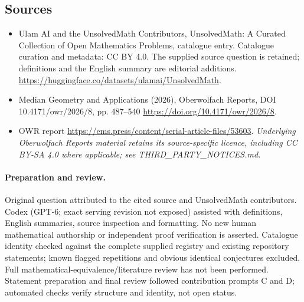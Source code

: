 \documentclass[11pt]{article}
\begin{document}
\subsection{Sources}
\begin{itemize}
\item[\hypertarget{source:statement:1}{S1}] Ulam AI and the UnsolvedMath Contributors, UnsolvedMath: A Curated Collection of Open Mathematics Problems, catalogue entry. Catalogue curation and metadata: CC BY 4.0. The supplied source question is retained; definitions and the English summary are editorial additions.
\url{https://huggingface.co/datasets/ulamai/UnsolvedMath}.
\item[\hypertarget{source:statement:2}{S2}] Median Geometry and Applications (2026), Oberwolfach Reports, DOI 10.4171/owr/2026/8, pp. 487--540
\url{https://doi.org/10.4171/owr/2026/8}.
\item[\hypertarget{source:statement:3}{S3}] OWR report
\url{https://ems.press/content/serial-article-files/53603}.
\textit{Underlying Oberwolfach Reports material retains its source-specific licence, including CC BY-SA 4.0 where applicable; see THIRD\_PARTY\_NOTICES.md.}
\end{itemize}
\paragraph{Preparation and review.}
Original question attributed to the cited source and UnsolvedMath contributors. Codex (GPT-6; exact serving revision not exposed) assisted with definitions, English summaries, source inspection and formatting. No new human mathematical authorship or independent proof verification is asserted. Catalogue identity checked against the complete supplied registry and existing repository statements; known flagged repetitions and obvious identical conjectures excluded. Full mathematical-equivalence/literature review has not been performed. Statement preparation and final review followed contribution prompts C and D; automated checks verify structure and identity, not open status.
\label{end:statement}
\end{document}
